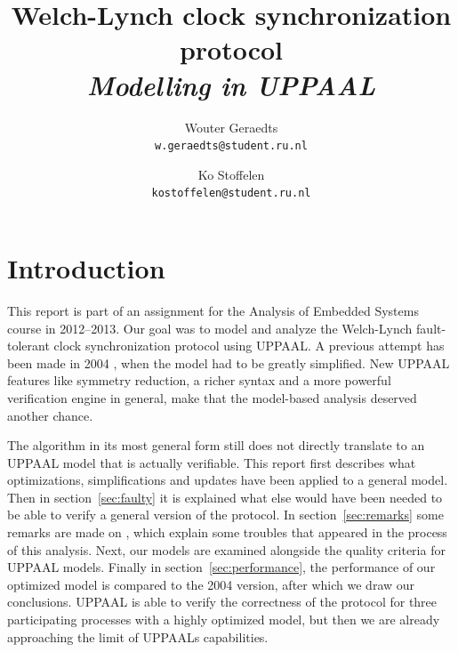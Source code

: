 \documentclass[a4paper,10pt]{article}
\title{Welch-Lynch clock synchronization protocol \\\textit{Modelling in UPPAAL}}
\author{
	Wouter Geraedts \\ \small{\texttt{w.geraedts@student.ru.nl}} \and
	Ko Stoffelen     \\ \small{\texttt{kostoffelen@student.ru.nl}}
}
\date{}
\newcommand{\UPPAAL}{UPPAAL\xspace}
\begin{document}
	\maketitle






\section{Introduction}


This report is part of an assignment for the Analysis of Embedded Systems course in 2012--2013. Our goal was to model and analyze the Welch-Lynch fault-tolerant clock synchronization protocol \cite{Welch1984Anew} using \UPPAAL. A previous attempt has been made in 2004 \cite{Aceto2004Notes}, when the model had to be greatly simplified. New \UPPAAL features like symmetry reduction, a richer syntax and a more powerful verification engine in general, make that the model-based analysis deserved another chance.

The algorithm in its most general form still does not directly translate to an \UPPAAL model that is actually verifiable. This report first describes what optimizations, simplifications and updates have been applied to a general model. Then in section~\ref{sec:faulty} it is explained what else would have been needed to be able to verify a general version of the protocol. In section~\ref{sec:remarks} some remarks are made on \cite{Aceto2004Notes}, which explain some troubles that appeared in the process of this analysis. Next, our models are examined alongside the quality criteria for \UPPAAL models. Finally in section~\ref{sec:performance}, the performance of our optimized model is compared to the 2004 version, after which we draw our conclusions. \UPPAAL is able to verify the correctness of the protocol for three participating processes with a highly optimized model, but then we are already approaching the limit of \UPPAAL{}s capabilities.
\end{document}
